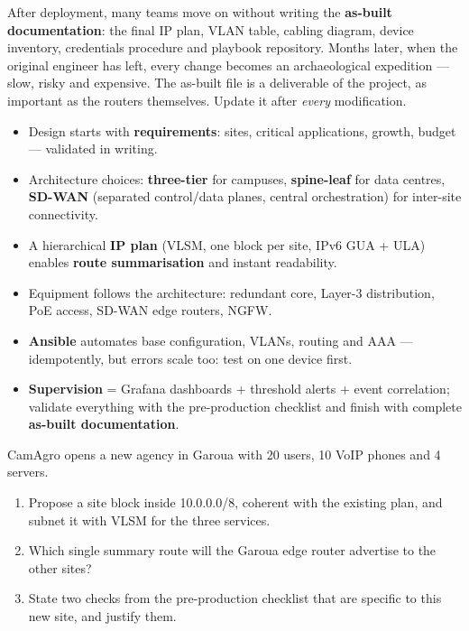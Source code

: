 \documentclass[11pt]{article}
\begin{document}
\begin{attention}
After deployment, many teams move on without writing the \textbf{as-built documentation}: the final IP plan, VLAN table, cabling diagram, device inventory, credentials procedure and playbook repository. Months later, when the original engineer has left, every change becomes an archaeological expedition — slow, risky and expensive. The as-built file is a deliverable of the project, as important as the routers themselves. Update it after \emph{every} modification.
\end{attention}

\begin{aretenir}
\begin{itemize}
\item Design starts with \textbf{requirements}: sites, critical applications, growth, budget — validated in writing.
\item Architecture choices: \textbf{three-tier} for campuses, \textbf{spine-leaf} for data centres, \textbf{SD-WAN} (separated control/data planes, central orchestration) for inter-site connectivity.
\item A hierarchical \textbf{IP plan} (VLSM, one block per site, IPv6 GUA + ULA) enables \textbf{route summarisation} and instant readability.
\item Equipment follows the architecture: redundant core, Layer-3 distribution, PoE access, SD-WAN edge routers, NGFW.
\item \textbf{Ansible} automates base configuration, VLANs, routing and AAA — idempotently, but errors scale too: test on one device first.
\item \textbf{Supervision} = Grafana dashboards + threshold alerts + event correlation; validate everything with the pre-production checklist and finish with complete \textbf{as-built documentation}.
\end{itemize}
\end{aretenir}

\begin{exercice}
CamAgro opens a new agency in Garoua with 20 users, 10 VoIP phones and 4 servers.
\begin{enumerate}
\item Propose a site block inside 10.0.0.0/8, coherent with the existing plan, and subnet it with VLSM for the three services.
\item Which single summary route will the Garoua edge router advertise to the other sites?
\item State two checks from the pre-production checklist that are specific to this new site, and justify them.
\end{enumerate}
\end{exercice}
\end{document}
